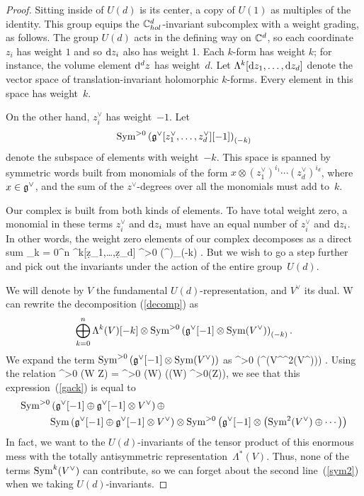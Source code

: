 \begin{proof}
Sitting inside of $U(d)$ is its center, a copy of $U(1)$ as multiples of the identity.
This group equips the $\mathbb C^d_{hol}$-invariant subcomplex with a weight grading, as follows.
The group $U(d)$ acts in the defining way on $\mathbb C^d$,
so each coordinate $z_i$ has weight $1$ and so ${\rm d} z_i$ also has weight 1.
Each $k$-form has weight $k$; for instance, the volume element ${\rm d}^d z$ has weight~$d$.
Let $\Lambda^k[{\rm d} z_1,\ldots,{\rm d} z_d]$ denote the vector space of translation-invariant holomorphic $k$-forms.
Every element in this space has weight~$k$.

On the other hand, $z_i^\vee$ has weight~$-1$. 
Let 
\[
{\rm Sym}^{>0} \left(\mathfrak g^\vee [z_1^\vee,\ldots,z_d^\vee][-1] \right)_{(-k)}
\]
denote the subspace of elements with weight~$-k$.
This space is spanned by symmetric words built from monomials of the form $x \otimes (z_1^\vee)^{i_1} \cdots (z_d^\vee)^{i_d}$, where $x \in \mathfrak g^\vee$,
and the sum of the $z^\vee$-degrees over all the monomials must add to~$k$.

Our complex is built from both kinds of elements.
To have total weight zero, a monomial in these terms $z_i^\vee$ and ${\rm d} z_i$ must have an equal number of $z_i^\vee$ and ${\rm d} z_i$.
In other words, the weight zero elements of our complex decomposes as a direct sum
\beqn\label{decomp}
\bigoplus_{k = 0}^n \Lambda^k[\d z_1,\ldots,\d z_d] \otimes \Sym^{>0} \left(\fg^ \right)_{(-k)} .
\eeqn
But we wish to go a step further and pick out the invariants under the action of the entire group~$U(d)$.

We will denote by $V$ the fundamental $U(d)$-representation, and $V^\vee$ its dual.
W can rewrite the decomposition (\ref{decomp}) as 
\[
\bigoplus_{k = 0}^n \Lambda^k(V)[-k] \otimes {\rm Sym}^{>0} \left(\mathfrak g^\vee [-1] \otimes {\rm Sym}(V^\vee)\right)_{(-k)} .
\]
We expand the term ${\rm Sym}^{>0} \left(\mathfrak g^\vee [-1] \otimes {\rm Sym}(V^\vee)\right)$ as
\beqn\label{gack}
\Sym^{>0} \left(\fg^\vee[-1] \tensor \left(\CC \oplus V^\vee  \oplus \Sym^2(V^\vee)\oplus \cdots \right)\right) .
\eeqn
Using the relation 
\beqn\label{symrel}
\Sym^{>0} (W \oplus Z) = \Sym^{>0} (W) \oplus (\Sym(W) \tensor \Sym^{>0}(Z)),
\eeqn
we see that this expression~(\ref{gack}) is equal to 
\begin{align}
{\rm Sym}^{>0} & \left(\mathfrak g^\vee[-1] \oplus \mathfrak g^\vee [-1] \otimes V^\vee \right) \oplus \label{sym1} \\
& {\rm Sym} \left(\mathfrak g^\vee[-1] \oplus \mathfrak g^\vee [-1] \otimes V^\vee\right) \otimes {\rm Sym}^{>0} \left(\mathfrak g^\vee[-1] \otimes \left({\rm Sym}^2(V^\vee)\oplus \cdots \right) \label{sym2} \right)
\end{align}
In fact, we want to the $U(d)$-invariants of the tensor product of this enormous mess with the totally antisymmetric representation~$\Lambda^*(V)$. 
Thus, none of the terms ${\rm Sym}^k(V^\vee)$ can contribute, so we can forget about the second line~(\ref{sym2}) when we taking $U(d)$-invariants. 


\end{proof}
